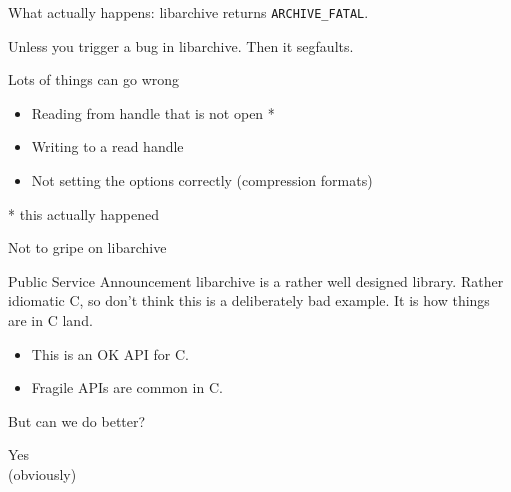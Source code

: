 \documentclass[handout]{beamer}
\renewcommand{\example}[1]{{\usebeamercolor[fg]{example text} #1}}
\begin{document}
\begin{frame}
  What actually happens: libarchive returns \texttt{ARCHIVE\_FATAL}.\pause

  Unless you trigger a bug in libarchive. \pause
  \alert{Then it segfaults.}
\end{frame}

\begin{frame}{Lots of things can go wrong}
  \begin{itemize}
    \item Reading from handle that is not open *
    \item Writing to a read handle
    \item Not setting the options correctly (compression formats)
  \end{itemize}
  \pause
  * this actually happened
\end{frame}

\begin{frame}{Not to gripe on libarchive}
  \begin{exampleblock}{Public Service Announcement}
    libarchive is a rather well designed library. Rather idiomatic C, so don't
    think this is a deliberately bad example. It is how things are in C land.
  \end{exampleblock}

  \begin{itemize}
    \item This is an OK API for C.
    \item Fragile APIs are common in C.
  \end{itemize}

  \vspace{2ex}
  \pause
  \begin{center}
    {\Large But can we do better?}
  \end{center}
\end{frame}

\begin{frame}
  \begin{center}
    {\Huge \example{Yes}}\\
    \pause
    {\scriptsize (obviously)}
  \end{center}
\end{frame}
\end{document}

